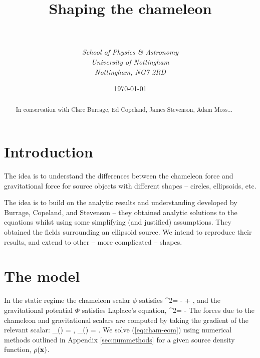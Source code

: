 \documentclass[a4paper, 12pt]{article}
\numberwithin{equation}{section}
\begin{document}
\title{{\bf Shaping the chameleon}}
\author{\\ \\ \it{School of Physics \& Astronomy} \\ \it{University of Nottingham} \\ \it{Nottingham, NG7 2RD}}

\date{\today}



\maketitle
\begin{abstract}
In conservation with Clare Burrage, Ed Copeland, James Stevenson, Adam Moss...
\end{abstract}

\tableofcontents   


\section{Introduction}
The idea is to understand the differences between the chameleon force and gravitational force for source objects with different shapes -- circles, ellipsoids, etc.

The idea is to build on the analytic results and understanding developed by Burrage, Copeland, and Stevenson -- they obtained analytic solutions to the equations whilst using some simplifying (and justified) assumptions. They obtained the fields surrounding an ellipsoid source. We intend to reproduce their results, and extend to other -- more complicated -- shapes.
\section{The model}
In the static regime the chameleon scalar $\phi$ satisfies
\bse
\bea
\label{eq:cham-eom}
\nabla^2\phi = - + ,
\eea
and the gravitational potential $\Phi$ satisfies Laplace's equation,
\bea
\label{eq:laplaceseqn}
\nabla^2\Phi = - \rho
\eea
\ese
The forces due to the chameleon and gravitational scalars are computed by taking the gradient of the relevant scalar:
\bea
\label{eq:forces}
_{(\phi)} = \nabla\phi,\qquad
{}_{(\Phi)} = \nabla\Phi.
\eea
We solve (\ref{eq:cham-eom}) using numerical methods outlined in Appendix \ref{sec:nummethods} for a given  source density function, $\rho({\bf{x}})$. 
\end{document}
